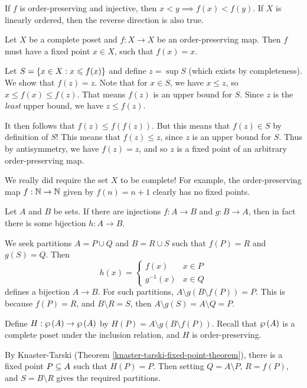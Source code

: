 \documentclass{article}
\begin{document}
\begin{corollary}
	If $f$ is order-preserving and injective, then $x < y \implies f(x) < f(y)$. If $X$ is linearly ordered, then the reverse direction is also true.
\end{corollary}

\begin{theorem}
	\label{knaster-tarski-fixed-point-theorem}
    Let $X$ be a complete poset and $f : X \to X$ be an order-preserving map. Then $f$ must have a fixed point $x \in X$, such that $f(x) = x$.
\end{theorem}

\begin{prf}
    Let $S = \left\lbrace x \in X : x \leqslant f(x) \right\rbrace$ and define $z = \sup S$ (which exists by completeness). We show that $f(z) = z$. Note that for $x \in S$, we have $x \leq z$, so $x \leq f(x) \leq f(z)$. That means $f(z)$ is an upper bound for $S$. Since $z$ is the \textit{least} upper bound, we have $z \leq f(z)$.
    
    It then follows that $f(z) \leq f(f(z))$. But this means that $f(z) \in S$ by definition of $S$! This means that $f(z) \leq z$, since $z$ is an upper bound for $S$. Thus by antisymmetry, we have $f(z) = z$, and so $z$ is a fixed point of an arbitrary order-preserving map.
\end{prf}

\begin{note}
	We really did require the set $X$ to be complete! For example, the order-preserving map $f: \mathbb{N} \to \mathbb{N}$ given by $f(n) = n+1$ clearly has no fixed points.
\end{note}

\begin{theorem}
	\label{schroder-bernstein-theorem}
    Let $A$ and $B$ be sets. If there are injections $f: A \to B$ and $g: B \to A$, then in fact there is some bijection $h: A \to B$.
\end{theorem}

\begin{prf}
    We seek partitions $A = P \cup Q$ and $B = R \cup S$ such that $f(P) = R$ and $g(S) = Q$. Then
    \[
	h(x) = \begin{cases}
		f(x) & x \in P \\
		g^{-1}(x) & x \in Q
	\end{cases}
	\]
	defines a bijection $A \to B$. For such partitions, $A \setminus g(B \setminus f(P)) = P$. This is because $f(P) = R$, and $B \setminus R = S$, then $A \setminus g(S) = A \setminus Q = P$.
	
	Define $H : \wp\left(A\right) \to \wp\left(A\right)$ by $H(P) = A \setminus g(B \setminus f(P))$. Recall that $\wp\left(A\right)$ is a complete poset under the inclusion relation, and $H$ is order-preserving.
	
	By Knaster-Tarski (Theorem \ref{knaster-tarski-fixed-point-theorem}), there is a fixed point $P \subseteq A$ such that $H(P) = P$. Then setting $Q = A \setminus P$, $R = f(P)$, and $S = B \setminus R$ gives the required partitions.
\end{prf}
\end{document}
